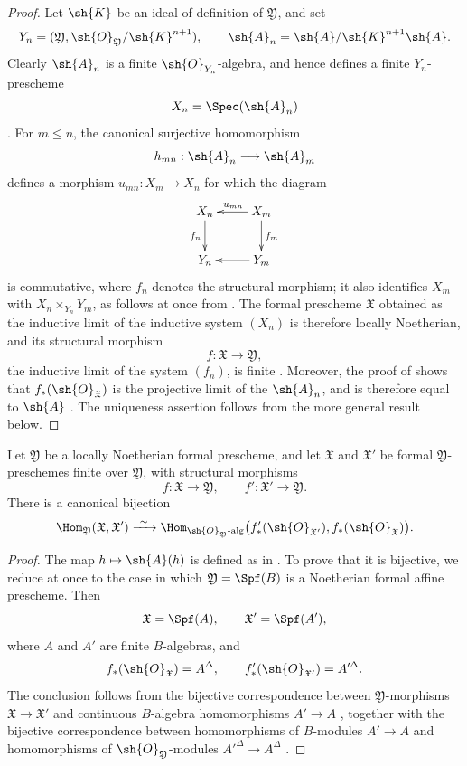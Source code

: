 \begin{proof}
Let $\sh{K}$ be an ideal of definition of $\mathfrak{Y}$, and set
\[
  Y_n=(\mathfrak{Y},
       \sh{O}_{\mathfrak{Y}}/\sh{K}^{n+1}),
  \qquad
  \sh{A}_n=\sh{A}/\sh{K}^{n+1}\sh{A}.
\]
Clearly $\sh{A}_n$ is a finite $\sh{O}_{Y_n}$-algebra, and hence
defines a finite $Y_n$-prescheme
\[
  X_n=\Spec(\sh{A}_n)
\]
.  For $m\leq n$, the canonical surjective
homomorphism
\[
  h_{mn}:\sh{A}_n\longrightarrow\sh{A}_m
\]
defines a morphism $u_{mn}:X_m\to X_n$ for which the diagram
\[
  \xymatrix{
    X_n\ar[d]_{f_n} &
    X_m\ar[l]_{u_{mn}}\ar[d]^{f_m}\\
    Y_n &
    Y_m\ar[l]
  }
\]
is commutative, where $f_n$ denotes the structural morphism; it
also identifies $X_m$ with
$X_n\times_{Y_n}Y_m$, as follows at once from
.  The formal prescheme $\mathfrak{X}$ obtained
as the inductive limit of the inductive system $(X_n)$ is therefore
locally Noetherian, and its structural morphism
\[
  f:\mathfrak{X}\longrightarrow\mathfrak{Y},
\]
the inductive limit of the system $(f_n)$, is finite
 .  Moreover, the proof of
 shows that
$f_*(\sh{O}_{\mathfrak{X}})$ is the projective limit of the
$\sh{A}_n$, and is therefore equal to $\sh{A}$
.  The uniqueness assertion follows from the
more general result below.
\end{proof}

\begin{proposition}[4.8.8]
\label{III.4.8.8}
Let $\mathfrak{Y}$ be a locally Noetherian formal prescheme, and
let $\mathfrak{X}$ and $\mathfrak{X}'$ be formal
$\mathfrak{Y}$-preschemes finite over $\mathfrak{Y}$, with
structural morphisms
\[
  f:\mathfrak{X}\to\mathfrak{Y},\qquad
  f':\mathfrak{X}'\to\mathfrak{Y}.
\]
There is a canonical bijection
\[
  \Hom_{\mathfrak{Y}}(\mathfrak{X},\mathfrak{X}')
  \xrightarrow{\ \sim\ }
  \Hom_{\sh{O}_{\mathfrak{Y}}\text{-alg}}
  \bigl(f'_*(\sh{O}_{\mathfrak{X}'}),
        f_*(\sh{O}_{\mathfrak{X}})\bigr).
\]
\end{proposition}

\begin{proof}
The map $h\mapsto\sh{A}(h)$ is defined as in
.  To prove that it is bijective, we reduce at
once to the case in which
$\mathfrak{Y}=\Spf(B)$ is a Noetherian formal affine prescheme.
Then
\[
  \mathfrak{X}=\Spf(A),\qquad
  \mathfrak{X}'=\Spf(A'),
\]
where $A$ and $A'$ are finite $B$-algebras, and
\[
  f_*(\sh{O}_{\mathfrak{X}})=A^\Delta,\qquad
  f'_*(\sh{O}_{\mathfrak{X}'})=A'^\Delta.
\]
The conclusion follows from the bijective correspondence between
$\mathfrak{Y}$-morphisms
$\mathfrak{X}\to\mathfrak{X}'$ and continuous $B$-algebra
homomorphisms $A'\to A$ , together with the
bijective correspondence between homomorphisms of $B$-modules
$A'\to A$ and homomorphisms of
$\sh{O}_{\mathfrak{Y}}$-modules
$A'^\Delta\to A^\Delta$ .
\end{proof}

